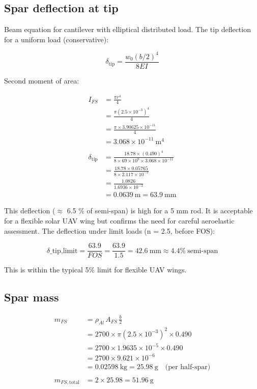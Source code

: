 \documentclass[10pt,a4paper]{article}
\begin{document}
\subsection{Spar deflection at tip}

Beam equation for cantilever with elliptical distributed load. The tip deflection for a uniform load (conservative):

\[
\delta_{\text{tip}} = \frac{w_0 (b/2)^4}{8 EI}
\]

Second moment of area:

\begin{align*}
I_{FS} &= \frac{\pi r^4}{4} \\
&= \frac{\pi (2.5 \times 10^{-3})^4}{4} \\
&= \frac{\pi \times 3.90625 \times 10^{-11}}{4} \\
&= 3.068 \times 10^{-11}\ \text{m}^4 \\
\\
\delta_{\text{tip}} &= \frac{18.78 \times (0.490)^4}{8 \times 69 \times 10^9 \times 3.068 \times 10^{-11}} \\
&= \frac{18.78 \times 0.05765}{8 \times 2.117 \times 10^{-3}} \\
&= \frac{1.0826}{1.6936 \times 10^{-2}} \\
&= 0.0639\ \text{m} = 63.9\ \text{mm}
\end{align*}

This deflection (${\approx}$ 6.5 \% of semi-span) is high for a 5 mm rod. It is acceptable for a flexible solar UAV wing but confirms the need for careful aeroelastic assessment. The deflection under limit loads (n = 2.5, before FOS):

$$\delta\_{\text{tip,limit}} = \frac{63.9}{FOS} = \frac{63.9}{1.5} = 42.6\ \text{mm} \approx 4.4\%\ \text{semi-span}$$

This is within the typical 5\% limit for flexible UAV wings.

\subsection{Spar mass}
\begin{align*}
m_{FS} &= \rho_{Al} \, A_{FS} \, \frac{b}{2} \\
&= 2700 \times \pi (2.5 \times 10^{-3})^2 \times 0.490 \\
&= 2700 \times 1.9635 \times 10^{-5} \times 0.490 \\
&= 2700 \times 9.621 \times 10^{-6} \\
&= 0.02598\ \text{kg} = 25.98\ \text{g} \quad \text{(per half-spar)} \\
\\
m_{FS,\text{total}} &= 2 \times 25.98 = 51.96\ \text{g}
\end{align*}
\end{document}
